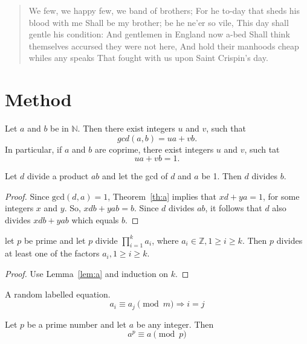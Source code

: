 \documentclass[
final
]{sta-thesis}
\begin{document}
\begin{quote}
We few, we happy few, we band of brothers;
For he to-day that sheds his blood with me
Shall be my brother; be he ne'er so vile,
This day shall gentle his condition:
And gentlemen in England now a-bed
Shall think themselves accursed they were not here,
And hold their manhoods cheap whiles any speaks
That fought with us upon Saint Crispin's day.
\end{quote}

\lipsum
\chapter{Method}

\lipsum

\begin{theorem}\label{th:a}
Let $a$ and $b$ be in $\mathbb{N}$. Then there exist integers $u$ and $v$, such that
\[
gcd(a,b) = ua+vb.
\]
In particular, if $a$ and $b$ are coprime, there exist integers $u$ and $v$, such tat
\[
ua+vb=1.
\]
\end{theorem}

\begin{lemma}\label{lem:a}
Let $d$ divide a product $ab$ and let the gcd of $d$ and $a$ be 1. Then $d$ divides $b$.
\end{lemma}

\begin{proof}
Since $\mathrm{gcd}(d,a)=1$, Theorem~\ref{th:a} implies that $xd + ya = 1$, for some integers $x$ and $y$.
So, $xdb + yab = b$. Since $d$ divides $ab$, it follows that $d$ also divides $xdb + yab$ which equals $b$.
\end{proof}

\begin{corollary}
let $p$ be prime and let $p$ divide $\prod_{i=1}^{k}a_{i}$, where $a_{i}\in\mathbb{Z}, 1\geq i\geq k$. Then $p$ divides at least one of the factors $a_{i}, 1\geq i\geq k$.
\end{corollary}

\begin{proof}
Use Lemma~\ref{lem:a} and induction on $k$.
\end{proof}

\noindent
A random labelled equation.
\begin{equation}\label{eq:a}
a_{i}\equiv a_{j} \pmod{m}\Rightarrow i=j
\end{equation}

\begin{theorem}
Let $p$ be a prime number and let $a$ be any integer. Then
\[
a^{p}\equiv a\pmod{p}
\]
\end{theorem}
\end{document}
